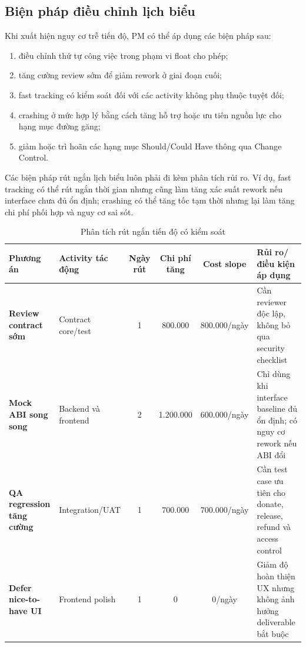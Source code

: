 \subsection{Biện pháp điều chỉnh lịch biểu}

Khi xuất hiện nguy cơ trễ tiến độ, PM có thể áp dụng các biện pháp sau:

\begin{enumerate}
  \item điều chỉnh thứ tự công việc trong phạm vi float cho phép;
  \item tăng cường review sớm để giảm rework ở giai đoạn cuối;
  \item fast tracking có kiểm soát đối với các activity không phụ thuộc tuyệt đối;
  \item crashing ở mức hợp lý bằng cách tăng hỗ trợ hoặc ưu tiên nguồn lực cho hạng mục đường găng;
  \item giảm hoặc trì hoãn các hạng mục Should/Could Have thông qua Change Control.
\end{enumerate}

Các biện pháp rút ngắn lịch biểu luôn phải đi kèm phân tích rủi ro. Ví dụ, fast tracking có thể rút ngắn thời gian nhưng cũng làm tăng xác suất rework nếu interface chưa đủ ổn định; crashing có thể tăng tốc tạm thời nhưng lại làm tăng chi phí phối hợp và nguy cơ sai sót.

\begin{table}[H]
\centering
\caption{Phân tích rút ngắn tiến độ có kiểm soát}
\label{tab:schedule-crashing-options}
\small
\begin{tabularx}{\textwidth}{| >{\bfseries}p{2.7cm} | p{2.6cm} | c | c | c | X |}
\hline
Phương án & Activity tác động & Ngày rút & Chi phí tăng & Cost slope & Rủi ro/điều kiện áp dụng \\
\hline
Review contract sớm & Contract core/test & 1 & 800.000 & 800.000/ngày & Cần reviewer độc lập, không bỏ qua security checklist \\ \hline
Mock ABI song song & Backend và frontend & 2 & 1.200.000 & 600.000/ngày & Chỉ dùng khi interface baseline đủ ổn định; có nguy cơ rework nếu ABI đổi \\ \hline
QA regression tăng cường & Integration/UAT & 1 & 700.000 & 700.000/ngày & Cần test case ưu tiên cho donate, release, refund và access control \\ \hline
Defer nice-to-have UI & Frontend polish & 1 & 0 & 0/ngày & Giảm độ hoàn thiện UX nhưng không ảnh hưởng deliverable bắt buộc \\
\hline
\end{tabularx}
\end{table}

